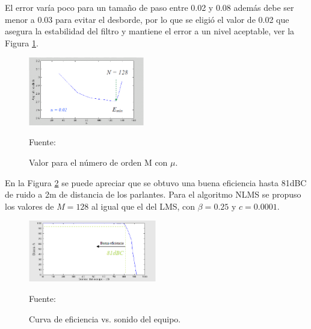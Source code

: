 \begin{enumerate}
\begin{enumerate}
El error varía poco para un tamaño de paso entre 0.02 y 0.08 además debe ser menor a 0.03 para evitar el desborde, por lo que se eligió el valor de 0.02 que asegura la estabilidad del filtro y mantiene el error a un nivel aceptable, ver la Figura \ref{fig:figura2.22}.
\vskip 0.2cm
\begin{figure}[ht]
\begin{center}
\includegraphics[width=0.45\textwidth]{Imagenes/Cap2/image023}
\end{center}
\begin{center}
\vskip -0.5cm
\caption{\small{Valor para el número de orden M con $\mu$.}}
\label{fig:figura2.22}
{\small{Fuente: \cite{simon}}}
\end{center}
\end{figure}
\newpage
En la Figura \ref{fig:figura2.23} se puede apreciar que se obtuvo una buena eficiencia hasta 81dBC de ruido a 2m de distancia de los parlantes. Para el algoritmo NLMS se propuso los valores de $M =128$ al igual que el del LMS, con $\beta = 0.25$ y $c = 0.0001$.
\vskip 0.2cm
\begin{figure}[ht]
\begin{center}
\includegraphics[width=0.5\textwidth]{Imagenes/Cap2/image024}
\end{center}
\begin{center}
\vskip -0.5cm
\caption{\small{Curva de eficiencia vs. sonido del equipo.}}
\label{fig:figura2.23}
{\small{Fuente: \cite{simon}}}
\end{center}
\end{figure}


\end{enumerate}
\end{enumerate}
